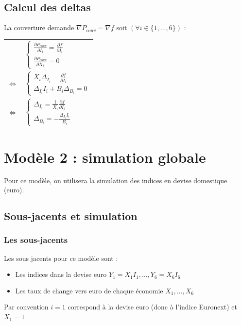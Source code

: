 \documentclass[a4paper,12pt]{article}
\begin{document}
\subsection{Calcul des deltas}
La couverture demande $\nabla P_{couv}=\nabla f$ soit $\left(\forall i\in\{1,\ldots,6\}\right)$ : 
\begin{center}
\begin{tabular}{cl}
& $ \begin{cases}
\frac{\partial P_{couv}}{\partial I_i} = \frac{\partial f}{\partial I_i} \\
\frac{\partial P_{couv}}{\partial X_i} = 0
\end{cases}
$ \\[2mm]
$\Leftrightarrow$ & $ \begin{cases}
X_i\Delta_{I_i} = \frac{\partial f}{\partial I_i} \\
\Delta_{I_i}I_i+B_i\Delta_{B_i} = 0
\end{cases}
$ \\[1mm]
$\Leftrightarrow$ & $ \begin{cases}
\Delta_{I_i} = \frac{1}{X_i}\frac{\partial f}{\partial I_i} \\
\Delta_{B_i} = -\frac{\Delta_{I_i}I_i}{B_i}
\end{cases}
$
\end{tabular}
\end{center}
\newpage
\section{Modèle 2 : simulation globale}
Pour ce modèle, on utilisera la simulation des indices en devise domestique (euro). 
\subsection{Sous-jacents et simulation}
\subsubsection{Les sous-jacents}
Les sous jacents pour ce modèle sont : 
\begin{itemize}[label=$\star$]
\item Les indices dans la devise euro $Y_1=X_1I_1,\ldots,Y_6=X_6I_6$
\item Les taux de change vers euro de chaque économie $X_1,\ldots,X_6$
\end{itemize}
Par convention $i=1$ correspond à la devise euro (donc à l'indice Euronext) et $X_1=1$
\end{document}
